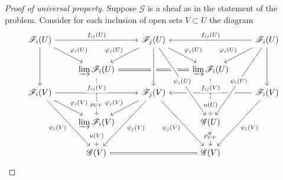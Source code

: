 \documentclass[10pt]{article}
\theoremstyle{definition}
\theoremstyle{remark}
\numberwithin{equation}{section}
\numberwithin{figure}{subsubsection}
\begin{document}
\begin{proof}[Proof of universal property]
  Suppose $\mathscr{G}$ is a sheaf as in the statement of the problem. Consider for each inclusion of open sets $V \subset U$ the diagram
  \begin{equation*}
    \begin{tikzcd}[row sep=small]
      \mathscr{F}_i(U) \arrow{rr}{f_{ij}(U)}\arrow{ddr}{\varphi_i(U)}\arrow{ddd} & & \mathscr{F}_j(U)\arrow{ddl}[swap]{\varphi_j(U)}\arrow{ddr}{\varphi_j(U)} & & \mathscr{F}_i(U)\arrow{ll}[swap]{f_{ij}(U)}\arrow{ddl}[swap]{\varphi_i(U)}\arrow{ddd}\\
      \\
      & \varinjlim \mathscr{F}_i(U)\arrow[dashed]{ddd}[description,yshift=-10pt]{\rho_{UV}}\arrow[equal]{rr} & & \varinjlim \mathscr{F}_i(U)\arrow[dashed]{ddd}[description,yshift=-10pt]{u(U)}\\
      \mathscr{F}_i(V)\arrow{ddr}{\varphi_i(V)}\arrow{ddddr}[swap]{\psi_i(V)}\arrow{rr}[fill=white]{f_{ij}(V)} & & \mathscr{F}_j(V)\arrow{ddl}[swap]{\varphi_j(V)}\arrow{ddddl}{\psi_j(V)}\arrow[leftarrow,crossing over]{uuu}& & \mathscr{F}_i(V) \arrow{ll}[swap,fill=white]{f_{ij}(V)}\\
      \\
      & \varinjlim \mathscr{F}_i(V)\arrow[dashed]{dd}[description,yshift=3pt]{u(V)} & & \mathscr{G}(U)\arrow{dd}[description,yshift=3pt]{\rho^{\mathscr{G}}_{UV}}\arrow[leftarrow,crossing over]{uuuuul}[description]{\psi_j(U)}\arrow[leftarrow, crossing over]{uuuuur}[description]{\psi_i(U)}\\
      \\
      & \mathscr{G}(V) \arrow[equal]{rr} & & \mathscr{G}(V) \arrow[leftarrow]{uuuul}{\psi_j(V)}\arrow[leftarrow]{uuuur}[swap]{\psi_i(V)}
    \end{tikzcd}
  \end{equation*}

\end{proof}
\end{document}
